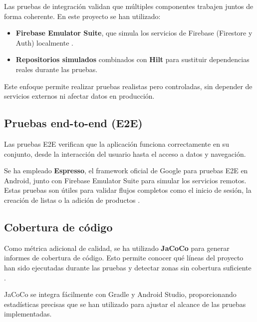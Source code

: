 Las pruebas de integración validan que múltiples componentes trabajen juntos de forma coherente. En este proyecto se han utilizado:

\begin{itemize}
    \item \textbf{Firebase Emulator Suite}, que simula los servicios de Firebase (Firestore y Auth) localmente \cite{firebase-emulator}.
    \item \textbf{Repositorios simulados} combinados con \textbf{Hilt} para sustituir dependencias reales durante las pruebas.
\end{itemize}

Este enfoque permite realizar pruebas realistas pero controladas, sin depender de servicios externos ni afectar datos en producción.

\subsection{Pruebas end-to-end (E2E)}

Las pruebas E2E verifican que la aplicación funciona correctamente en su conjunto, desde la interacción del usuario hasta el acceso a datos y navegación.

Se ha empleado \textbf{Espresso}, el framework oficial de Google para pruebas E2E en Android, junto con Firebase Emulator Suite para simular los servicios remotos. Estas pruebas son útiles para validar flujos completos como el inicio de sesión, la creación de listas o la adición de productos \cite{android-testing}.

\subsection{Cobertura de código}

Como métrica adicional de calidad, se ha utilizado \textbf{JaCoCo} para generar informes de cobertura de código. Esto permite conocer qué líneas del proyecto han sido ejecutadas durante las pruebas y detectar zonas sin cobertura suficiente \cite{jacoco}.

JaCoCo se integra fácilmente con Gradle y Android Studio, proporcionando estadísticas precisas que se han utilizado para ajustar el alcance de las pruebas implementadas.
